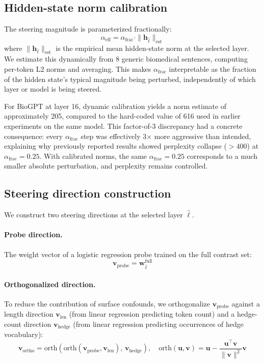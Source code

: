 \documentclass[11pt,a4paper]{article}
\begin{document}
\subsection{Hidden-state norm calibration}

The steering magnitude is parameterized fractionally:
\begin{equation}
\alpha_{\text{eff}} = \alpha_{\text{frac}} \cdot
\|\mathbf{h}_{\hat{\ell}}\|_{\text{est}}
\label{eq:alphaeff}
\end{equation}
where $\|\mathbf{h}_{\hat{\ell}}\|_{\text{est}}$ is the empirical mean
hidden-state norm at the selected layer. We estimate this dynamically
from 8 generic biomedical sentences, computing per-token L2 norms and
averaging. This makes $\alpha_{\mathrm{frac}}$ interpretable as the
fraction of the hidden state's typical magnitude being perturbed,
independently of which layer or model is being steered.

For BioGPT at layer 16, dynamic calibration yields a norm estimate of
approximately 205, compared to the hard-coded value of 616 used in
earlier experiments on the same model. This factor-of-3 discrepancy had
a concrete consequence: every $\alpha_{\mathrm{frac}}$ step was
effectively 3$\times$ more aggressive than intended, explaining why
previously reported results showed perplexity collapse ($>400$) at
$\alpha_{\mathrm{frac}} = 0.25$. With calibrated norms, the same
$\alpha_{\mathrm{frac}} = 0.25$ corresponds to a much smaller absolute
perturbation, and perplexity remains controlled.

\subsection{Steering direction construction}

We construct two steering directions at the selected layer $\hat{\ell}$.

\paragraph{Probe direction.}
The weight vector of a logistic regression probe trained on the full
contrast set:
\begin{equation}
\mathbf{v}_{\text{probe}} = \mathbf{w}^{\text{full}}_{\hat{\ell}}
\end{equation}

\paragraph{Orthogonalized direction.}
To reduce the contribution of surface confounds, we orthogonalize
$\mathbf{v}_{\text{probe}}$ against a length direction
$\mathbf{v}_{\mathrm{len}}$ (from linear regression predicting token
count) and a hedge-count direction $\mathbf{v}_{\mathrm{hedge}}$ (from
linear regression predicting occurrences of hedge vocabulary):
\begin{equation}
\mathbf{v}_{\text{ortho}} = \mathrm{orth}\!\left(
\mathrm{orth}(\mathbf{v}_{\text{probe}},
\mathbf{v}_{\text{len}}),\,
\mathbf{v}_{\text{hedge}}\right), \quad
\mathrm{orth}(\mathbf{u}, \mathbf{v}) = \mathbf{u} -
\frac{\mathbf{u}^\top\mathbf{v}}{\|\mathbf{v}\|^2}\mathbf{v}
\end{equation}
\end{document}
